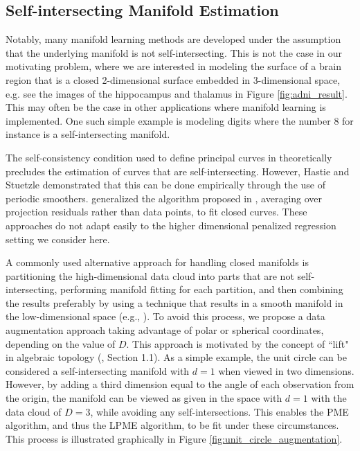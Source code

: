 \documentclass[12pt]{article}
\theoremstyle{definition}
\begin{document}
\subsection{Self-intersecting Manifold Estimation}\label{ss:selfInt}

Notably, many manifold learning methods are developed under the assumption that the underlying manifold is not self-intersecting. This is not the case in our motivating problem, where we are interested in modeling the surface of a brain region that is a closed 2-dimensional surface embedded in 3-dimensional space, e.g. see the images of the hippocampus and thalamus in Figure \ref{fig:adni_result}. This may often be the case in other applications where manifold learning is implemented. One such simple example is modeling digits where the number 8 for instance is a self-intersecting manifold.

The self-consistency condition used to define principal curves in \cite{hastiePrincipalCurves1989} theoretically precludes the estimation of curves that are self-intersecting. However, Hastie and Stuetzle demonstrated that this can be done empirically through the use of periodic smoothers. \cite{banfieldIceFloeIdentification1992} generalized the algorithm proposed in \cite{hastiePrincipalCurves1989}, averaging over projection residuals rather than data points, to fit closed curves. These approaches do not adapt easily to the higher dimensional penalized regression setting we consider here.

A commonly used alternative approach for handling closed manifolds is partitioning the high-dimensional data cloud into parts that are not self-intersecting, performing manifold fitting for each partition, and then combining the results preferably by using a technique that results in a smooth manifold in the low-dimensional space (e.g., \cite{mengPrincipalManifoldEstimation2021}). To avoid this process, we propose a data augmentation approach taking advantage of polar or spherical coordinates, depending on the value of $D$. This approach is motivated by the concept of ``lift" in algebraic topology (\cite{hatcher2002algebraic}, Section 1.1). As a simple example, the unit circle can be considered a self-intersecting manifold with $d = 1$ when viewed in two dimensions. However, by adding a third dimension equal to the angle of each observation from the origin, the manifold can be viewed as given in the space with $d = 1$ with the data cloud of $D = 3$, while avoiding any self-intersections. This enables the PME algorithm, and thus the LPME algorithm, to be fit under these circumstances. This process is illustrated graphically in Figure \ref{fig:unit_circle_augmentation}.
\end{document}
